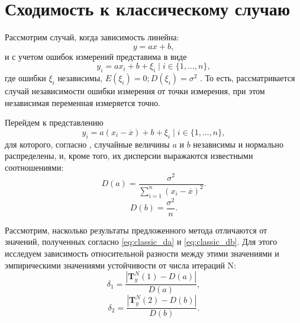 \documentclass[11pt,a4paper]{article}
\theoremstyle{definition}
\begin{document}

\section{Сходимость к классическому случаю}

Рассмотрим случай, когда зависимость линейна:
\[
  y = ax + b,
\]
и с учетом ошибок измерений представима в виде
\[
  y_i = ax_i + b + \xi_i \mid i \in \{ 1, \dots, n \},
\]
где ошибки $\xi_i$ независимы, $E(\xi_i) = 0; D(\xi_i) = \sigma^2$ \cite{Vatunin05}.
То есть, рассматривается случай независимости ошибки измерения от точки измерения,
при этом независимая переменная измеряется точно.

Перейдем к представлению
\[
  y_i = a(x_i - \overline{x}) + b + \xi_i \mid i \in \{ 1, \dots, n \},
\]
для которого, согласно \cite{Vatunin05}, случайные величины $a$ и $b$ независимы
и нормально распределены, и, кроме того, их дисперсии выражаются известными соотношениями:
\begin{equation}
  \label{eq:classic_da}
  D(a) = \frac{\sigma^2}{\sum_{i = 1}^n (x_i - \overline{x})^2}.
\end{equation}
\begin{equation}
  \label{eq:classic_db}
  D(b) = \frac{\sigma^2}{n}.
\end{equation}

Рассмотрим, насколько результаты предложенного метода отличаются от значений,
полученных согласно \eqref{eq:classic_da} и \eqref{eq:classic_db}. Для этого исследуем
зависимость относительной разности между этими значениями и эмпирическими значениями устойчивости от
числа итераций N:
\[
  \delta_1 = \frac{| \mathbf{T}^N_y(1) - D(a) |}{D(a)},
\]
\[
  \delta_2 = \frac{| \mathbf{T}^N_y(2) - D(b) |}{D(b)}.
\]
\end{document}
